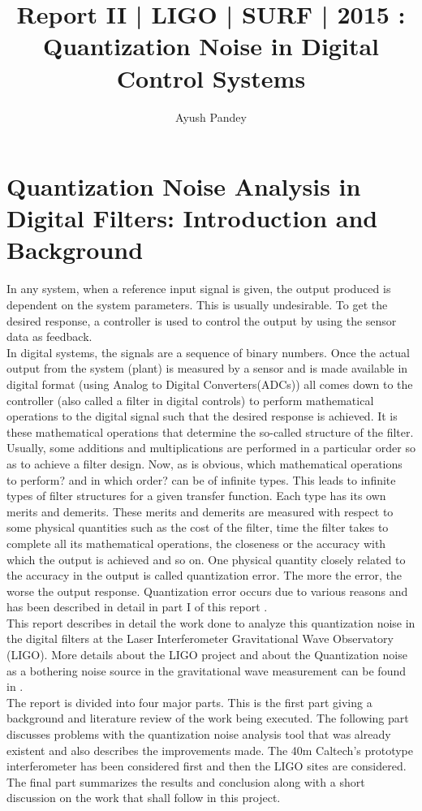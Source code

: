 \documentclass[colorlinks=true,pdfstartview=FitV,linkcolor=blue,
            citecolor=red,urlcolor=magenta]{ligodoc}
\title{Report II | LIGO | SURF | 2015 : Quantization Noise in Digital Control Systems}
\author{Ayush Pandey}
\begin{document}
\section{Quantization Noise Analysis in Digital Filters: Introduction and Background}
In any system, when a reference input signal is given, the output produced is dependent on the system parameters. This is usually undesirable. To get the desired response, a controller is used to control the output by using the sensor data as feedback.\\ In digital systems, the signals are a sequence of binary numbers. Once the actual output from the system (plant) is measured by a sensor and is made available in digital format (using Analog to Digital Converters(ADCs)) all comes down to the controller (also called a filter in digital controls) to perform mathematical operations to the digital signal such that the desired response is achieved. It is these mathematical operations that determine the so-called structure of the filter. Usually, some additions and multiplications are performed in a particular order so as to achieve a filter design. Now, as is obvious, which mathematical operations to perform? and in which order? can be of infinite types. This leads to infinite types of filter structures for a given transfer function. Each type has its own merits and demerits. These merits and demerits are measured with respect to some physical quantities such as the cost of the filter, time the filter takes to complete all its mathematical operations, the closeness or the accuracy with which the output is achieved and so on. One physical quantity closely related to the accuracy in the output is called quantization error. The more the error, the worse the output response. Quantization error occurs due to various reasons and has been described in detail in part I of this report \cite{reportI}.\\
This report describes in detail the work done to analyze this quantization noise in the digital filters at the Laser Interferometer Gravitational Wave Observatory (LIGO). More details about the LIGO project and about the Quantization noise as a bothering noise source in the gravitational wave measurement can be found in \cite{reportI}. \\
The report is divided into four major parts. This is the first part giving a background and literature review of the work being executed. The following part discusses problems with the quantization noise analysis tool that was already existent and also describes the improvements made. The 40m Caltech's prototype interferometer has been considered first and then the LIGO sites are considered. The final part summarizes the results and conclusion along with a short discussion on the work that shall follow in this project.
\end{document}
